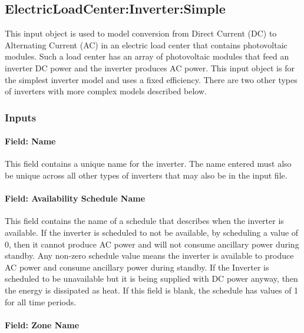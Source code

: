 \subsection{ElectricLoadCenter:Inverter:Simple}\label{electricloadcenterinvertersimple}

This input object is used to model conversion from Direct Current (DC) to Alternating Current (AC) in an electric load center that contains photovoltaic modules. Such a load center has an array of photovoltaic modules that feed an inverter DC power and the inverter produces AC power. This input object is for the simplest inverter model and uses a fixed efficiency. There are two other types of inverters with more complex models described below.

\subsubsection{Inputs}\label{inputs-3-010}

\paragraph{Field: Name}\label{field-name-2-010}

This field contains a unique name for the inverter. The name entered must also be unique across all other types of inverters that may also be in the input file.

\paragraph{Field: Availability Schedule Name}\label{field-availability-schedule-name-1-003}

This field contains the name of a schedule that describes when the inverter is available. If the inverter is scheduled to not be available, by scheduling a value of 0, then it cannot produce AC power and will not consume ancillary power during standby. Any non-zero schedule value means the inverter is available to produce AC power and consume ancillary power during standby. If the Inverter is scheduled to be unavailable but it is being supplied with DC power anyway, then the energy is dissipated as heat. If this field is blank, the schedule has values of 1 for all time periods.

\paragraph{Field: Zone Name}\label{field-zone-name-1-003}

